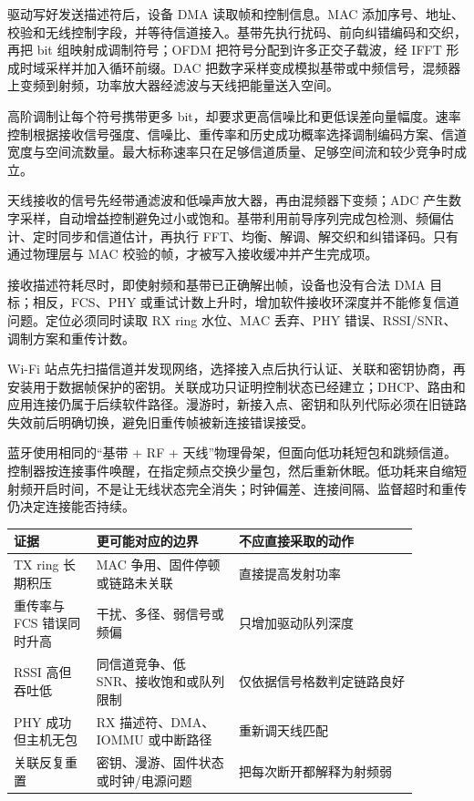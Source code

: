 
驱动写好发送描述符后，设备 DMA 读取帧和控制信息。MAC 添加序号、地址、校验和无线控制字段，并等待信道接入。基带先执行扰码、前向纠错编码和交织，再把 bit 组映射成调制符号；OFDM 把符号分配到许多正交子载波，经 IFFT 形成时域采样并加入循环前缀。DAC 把数字采样变成模拟基带或中频信号，混频器上变频到射频，功率放大器经滤波与天线把能量送入空间。

高阶调制让每个符号携带更多 bit，却要求更高信噪比和更低误差向量幅度。速率控制根据接收信号强度、信噪比、重传率和历史成功概率选择调制编码方案、信道宽度与空间流数量。最大标称速率只在足够信道质量、足够空间流和较少竞争时成立。


天线接收的信号先经带通滤波和低噪声放大器，再由混频器下变频；ADC 产生数字采样，自动增益控制避免过小或饱和。基带利用前导序列完成包检测、频偏估计、定时同步和信道估计，再执行 FFT、均衡、解调、解交织和纠错译码。只有通过物理层与 MAC 校验的帧，才被写入接收缓冲并产生完成项。

接收描述符耗尽时，即使射频和基带已正确解出帧，设备也没有合法 DMA 目标；相反，FCS、PHY 或重试计数上升时，增加软件接收环深度并不能修复信道问题。定位必须同时读取 RX ring 水位、MAC 丢弃、PHY 错误、RSSI/SNR、调制方案和重传计数。


Wi-Fi 站点先扫描信道并发现网络，选择接入点后执行认证、关联和密钥协商，再安装用于数据帧保护的密钥。关联成功只证明控制状态已经建立；DHCP、路由和应用连接仍属于后续软件路径。漫游时，新接入点、密钥和队列代际必须在旧链路失效前后明确切换，避免旧重传帧被新连接错误接受。

蓝牙使用相同的“基带 + RF + 天线”物理骨架，但面向低功耗短包和跳频信道。控制器按连接事件唤醒，在指定频点交换少量包，然后重新休眠。低功耗来自缩短射频开启时间，不是让无线状态完全消失；时钟偏差、连接间隔、监督超时和重传仍决定连接能否持续。

\begin{longtable}{L{0.18\linewidth}L{0.31\linewidth}L{0.39\linewidth}}
\toprule
证据 & 更可能对应的边界 & 不应直接采取的动作 \\
\midrule
TX ring 长期积压 & MAC 争用、固件停顿或链路未关联 & 直接提高发射功率 \\\tablerowrule
重传率与 FCS 错误同时升高 & 干扰、多径、弱信号或频偏 & 只增加驱动队列深度 \\\tablerowrule
RSSI 高但吞吐低 & 同信道竞争、低 SNR、接收饱和或队列限制 & 仅依据信号格数判定链路良好 \\\tablerowrule
PHY 成功但主机无包 & RX 描述符、DMA、IOMMU 或中断路径 & 重新调天线匹配 \\\tablerowrule
关联反复重置 & 密钥、漫游、固件状态或时钟/电源问题 & 把每次断开都解释为射频弱 \\
\bottomrule
\end{longtable}

